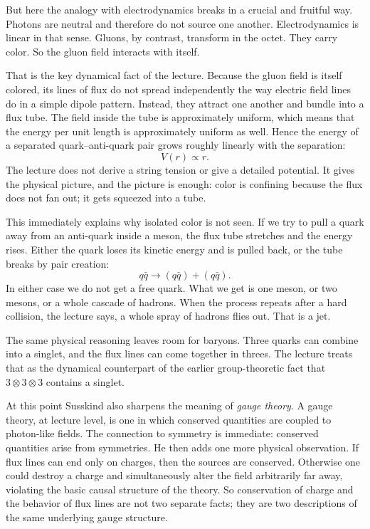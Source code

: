 But here the analogy with electrodynamics breaks in a crucial and fruitful way. Photons are neutral and therefore do not source one another. Electrodynamics is linear in that sense. Gluons, by contrast, transform in the octet. They carry color. So the gluon field interacts with itself.

That is the key dynamical fact of the lecture. Because the gluon field is itself colored, its lines of flux do not spread independently the way electric field lines do in a simple dipole pattern. Instead, they attract one another and bundle into a flux tube. The field inside the tube is approximately uniform, which means that the energy per unit length is approximately uniform as well. Hence the energy of a separated quark--anti-quark pair grows roughly linearly with the separation:
\begin{equation}
V(r)\propto r.
\end{equation}
The lecture does not derive a string tension or give a detailed potential. It gives the physical picture, and the picture is enough: color is confining because the flux does not fan out; it gets squeezed into a tube.

This immediately explains why isolated color is not seen. If we try to pull a quark away from an anti-quark inside a meson, the flux tube stretches and the energy rises. Either the quark loses its kinetic energy and is pulled back, or the tube breaks by pair creation:
\begin{equation}
q\bar q \longrightarrow (q\bar q) + (q\bar q).
\end{equation}
In either case we do not get a free quark. What we get is one meson, or two mesons, or a whole cascade of hadrons. When the process repeats after a hard collision, the lecture says, a whole spray of hadrons flies out. That is a jet.

The same physical reasoning leaves room for baryons. Three quarks can combine into a singlet, and the flux lines can come together in threes. The lecture treats that as the dynamical counterpart of the earlier group-theoretic fact that \(3\otimes3\otimes3\) contains a singlet.

At this point Susskind also sharpens the meaning of \emph{gauge theory}. A gauge theory, at lecture level, is one in which conserved quantities are coupled to photon-like fields. The connection to symmetry is immediate: conserved quantities arise from symmetries. He then adds one more physical observation. If flux lines can end only on charges, then the sources are conserved. Otherwise one could destroy a charge and simultaneously alter the field arbitrarily far away, violating the basic causal structure of the theory. So conservation of charge and the behavior of flux lines are not two separate facts; they are two descriptions of the same underlying gauge structure.

